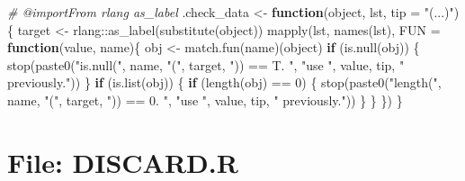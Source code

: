 \documentclass[
]{article}
\newenvironment{Shaded}{\begin{snugshade}}{\end{snugshade}}
\newcommand{\AttributeTok}[1]{\textcolor[rgb]{0.77,0.63,0.00}{#1}}
\newcommand{\CommentTok}[1]{\textcolor[rgb]{0.56,0.35,0.01}{\textit{#1}}}
\newcommand{\ControlFlowTok}[1]{\textcolor[rgb]{0.13,0.29,0.53}{\textbf{#1}}}
\newcommand{\DecValTok}[1]{\textcolor[rgb]{0.00,0.00,0.81}{#1}}
\newcommand{\FunctionTok}[1]{\textcolor[rgb]{0.00,0.00,0.00}{#1}}
\newcommand{\NormalTok}[1]{#1}
\newcommand{\OtherTok}[1]{\textcolor[rgb]{0.56,0.35,0.01}{#1}}
\newcommand{\SpecialCharTok}[1]{\textcolor[rgb]{0.00,0.00,0.00}{#1}}
\newcommand{\StringTok}[1]{\textcolor[rgb]{0.31,0.60,0.02}{#1}}
\begin{document}
\begin{Shaded}
\begin{Highlighting}[]
\CommentTok{\#\textquotesingle{} @importFrom rlang as\_label}
\NormalTok{.check\_data }\OtherTok{\textless{}{-}} 
  \ControlFlowTok{function}\NormalTok{(object, lst, }\AttributeTok{tip =} \StringTok{"(...)"}\NormalTok{)\{}
\NormalTok{    target }\OtherTok{\textless{}{-}}\NormalTok{ rlang}\SpecialCharTok{::}\FunctionTok{as\_label}\NormalTok{(}\FunctionTok{substitute}\NormalTok{(object))}
    \FunctionTok{mapply}\NormalTok{(lst, }\FunctionTok{names}\NormalTok{(lst), }\AttributeTok{FUN =} \ControlFlowTok{function}\NormalTok{(value, name)\{}
\NormalTok{             obj }\OtherTok{\textless{}{-}} \FunctionTok{match.fun}\NormalTok{(name)(object)}
             \ControlFlowTok{if}\NormalTok{ (}\FunctionTok{is.null}\NormalTok{(obj)) \{}
               \FunctionTok{stop}\NormalTok{(}\FunctionTok{paste0}\NormalTok{(}\StringTok{"is.null("}\NormalTok{, name, }\StringTok{"("}\NormalTok{, target, }\StringTok{")) == T. "}\NormalTok{,}
                           \StringTok{"use \textasciigrave{}"}\NormalTok{, value, tip, }\StringTok{"\textasciigrave{} previously."}\NormalTok{))}
\NormalTok{             \}}
             \ControlFlowTok{if}\NormalTok{ (}\FunctionTok{is.list}\NormalTok{(obj)) \{}
               \ControlFlowTok{if}\NormalTok{ (}\FunctionTok{length}\NormalTok{(obj) }\SpecialCharTok{==} \DecValTok{0}\NormalTok{) \{}
                 \FunctionTok{stop}\NormalTok{(}\FunctionTok{paste0}\NormalTok{(}\StringTok{"length("}\NormalTok{, name, }\StringTok{"("}\NormalTok{, target, }\StringTok{")) == 0. "}\NormalTok{,}
                             \StringTok{"use \textasciigrave{}"}\NormalTok{, value, tip, }\StringTok{"\textasciigrave{} previously."}\NormalTok{))}
\NormalTok{               \}}
\NormalTok{             \}}
\NormalTok{           \})}
\NormalTok{  \}}
\end{Highlighting}
\end{Shaded}

\hypertarget{file-discard.r}{%
\section{File: DISCARD.R}\label{file-discard.r}}
\end{document}
